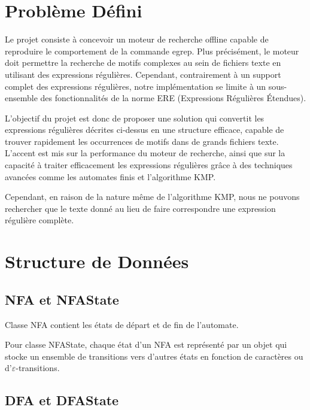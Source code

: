 \documentclass[11pt,english]{article}
\begin{document}
\section{Problème Défini}

\indent

Le projet consiste à concevoir un moteur de recherche offline capable de reproduire le comportement de la commande egrep. Plus précisément, le moteur doit permettre la recherche de motifs complexes au sein de fichiers texte en utilisant des expressions régulières. Cependant, contrairement à un support complet des expressions régulières, notre implémentation se limite à un sous-ensemble des fonctionnalités de la norme ERE (Expressions Régulières Étendues).

\indent L'objectif du projet est donc de proposer une solution qui convertit les expressions régulières décrites ci-dessus en une structure efficace, capable de trouver rapidement les occurrences de motifs dans de grands fichiers texte. L'accent est mis sur la performance du moteur de recherche, ainsi que sur la capacité à traiter efficacement les expressions régulières grâce à des techniques avancées comme les automates finis et l'algorithme KMP.

\indent Cependant, en raison de la nature même de l'algorithme KMP, nous ne pouvons rechercher que le texte donné au lieu de faire correspondre une expression régulière complète.

\section{Structure de Données}

\subsection{NFA et NFAState}

\indent 

Classe NFA contient les états de départ et de fin de l'automate.


\indent Pour classe NFAState, chaque état d'un NFA est représenté par un objet qui stocke un ensemble de transitions vers d'autres états en fonction de caractères ou d'$\varepsilon $-transitions.

\subsection{DFA et DFAState}

\indent
\end{document}
